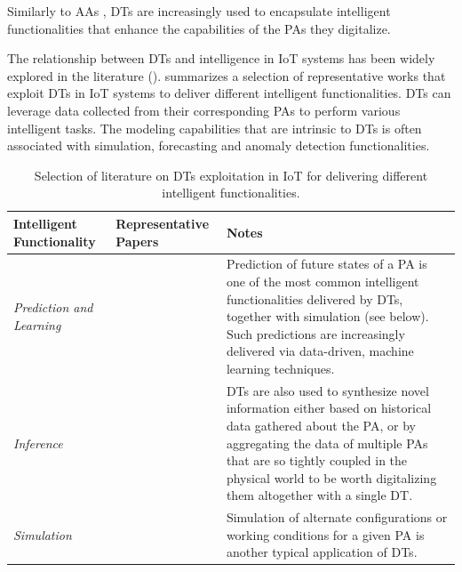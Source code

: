 
Similarly to AAs , \acp{DT} are increasingly used to encapsulate intelligent functionalities that enhance the capabilities of the \acp{PA} they digitalize.

The relationship between \acp{DT} and intelligence in IoT systems has been widely explored in the literature ().
%
 summarizes a selection of representative works that exploit \acp{DT} in IoT systems to deliver different intelligent functionalities.
%
\acp{DT} can leverage data collected from their corresponding \acp{PA} to perform various intelligent tasks.
%
The modeling capabilities that are intrinsic to \acp{DT} is often associated with simulation, forecasting and anomaly detection functionalities.


\begin{table}
    \centering
    \renewcommand{\arraystretch}{1.2}
    \footnotesize
    \begin{tabularx}{\textwidth}{|p{2.75cm}|p{2.75cm}|X|}
        \hline
        \textbf{Intelligent Functionality} & \textbf{Representative Papers} & \textbf{Notes} \\
        \hline
        \emph{Prediction and Learning} & \cite{Elayan_Aloqaily_Guizani_2021} \cite{Hu2022} \cite{Qiao2019} \cite{Qian2023} \cite{DBLP:journals/tvt/ZhangWXZLNH23} \cite{DBLP:journals/tifs/AliKLYTP23} \cite{MULLER2022126} & Prediction of future states of a PA is one of the most common intelligent functionalities delivered by DTs, together with simulation (see below). Such predictions are increasingly delivered via data-driven, machine learning techniques. \\
        \hline
        \emph{Inference} & \cite{DBLP:journals/access/XuSLZ19} \cite{dt_automated_behavior_analysis} \cite{QIAN2024111349} \cite{DBLP:journals/iotj/ZhouLQ24} & DTs are also used to synthesize novel information either based on historical data gathered about the PA, or by aggregating the data of multiple PAs that are so tightly coupled in the physical world to be worth digitalizing them altogether with a single DT. \\
        \hline
        \emph{Simulation} & \cite{Boschert_Rosen_2016} \cite{Hofmann2019} \cite{Elahi2021} \cite{Karakra2019} \cite{Danilczyk_Sun_He_2019} \cite{DBLP:journals/jsac/WangDWRGD23} \cite{QIAN2024111349} & Simulation of alternate configurations or working conditions for a given PA is another typical application of DTs. \\
        \hline
    \end{tabularx}
    \caption{Selection of literature on DTs exploitation in IoT for delivering different intelligent functionalities.}
    \label{tab:dt_technology_papers}
\end{table}


